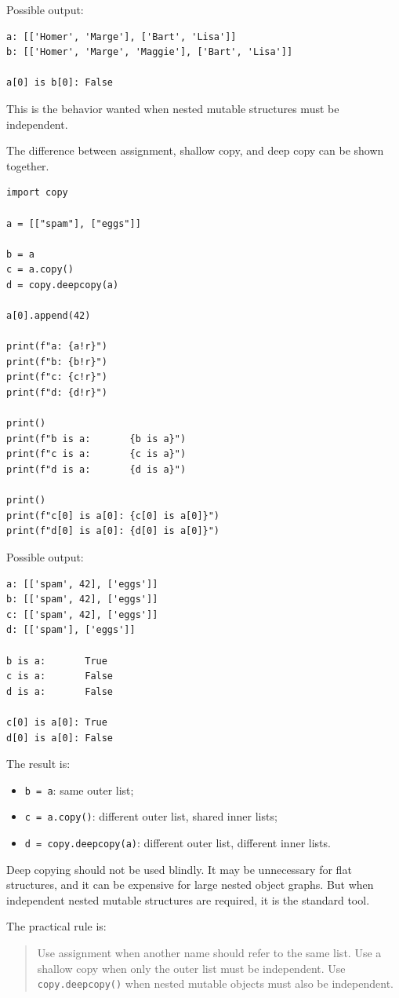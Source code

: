 Possible output:

\begin{verbatim}
a: [['Homer', 'Marge'], ['Bart', 'Lisa']]
b: [['Homer', 'Marge', 'Maggie'], ['Bart', 'Lisa']]

a[0] is b[0]: False
\end{verbatim}

This is the behavior wanted when nested mutable structures must be independent.

The difference between assignment, shallow copy, and deep copy can be shown together.

\begin{verbatim}
import copy

a = [["spam"], ["eggs"]]

b = a
c = a.copy()
d = copy.deepcopy(a)

a[0].append(42)

print(f"a: {a!r}")
print(f"b: {b!r}")
print(f"c: {c!r}")
print(f"d: {d!r}")

print()
print(f"b is a:       {b is a}")
print(f"c is a:       {c is a}")
print(f"d is a:       {d is a}")

print()
print(f"c[0] is a[0]: {c[0] is a[0]}")
print(f"d[0] is a[0]: {d[0] is a[0]}")
\end{verbatim}

Possible output:

\begin{verbatim}
a: [['spam', 42], ['eggs']]
b: [['spam', 42], ['eggs']]
c: [['spam', 42], ['eggs']]
d: [['spam'], ['eggs']]

b is a:       True
c is a:       False
d is a:       False

c[0] is a[0]: True
d[0] is a[0]: False
\end{verbatim}

The result is:

\begin{itemize}
    \item \texttt{b = a}: same outer list;
    \item \texttt{c = a.copy()}: different outer list, shared inner lists;
    \item \texttt{d = copy.deepcopy(a)}: different outer list, different inner lists.
\end{itemize}

Deep copying should not be used blindly. It may be unnecessary for flat structures, and it can be expensive for large nested object graphs. But when independent nested mutable structures are required, it is the standard tool.

The practical rule is:

\begin{quote}
Use assignment when another name should refer to the same list. Use a shallow copy when only the outer list must be independent. Use \texttt{copy.deepcopy()} when nested mutable objects must also be independent.
\end{quote}